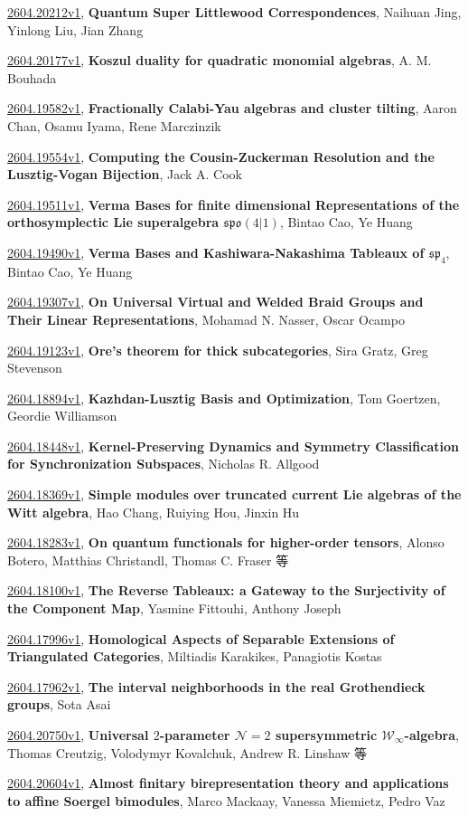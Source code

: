 \documentclass[9pt, a4paper]{article}
\theoremstyle{plain}
\theoremstyle{definition}
\theoremstyle{remark}
\newcommand{\arxiv}[3]{\href{https://arxiv.org/abs/#1}{#1}, \textbf{\textcolor{arxivblue}{#2}}, #3}
\begin{document}
\arxiv{2604.20212v1}{Quantum Super Littlewood Correspondences}{Naihuan Jing, Yinlong Liu, Jian Zhang}

\arxiv{2604.20177v1}{Koszul duality for quadratic monomial algebras}{A. M. Bouhada}

\arxiv{2604.19582v1}{Fractionally Calabi-Yau algebras and cluster tilting}{Aaron Chan, Osamu Iyama, Rene Marczinzik}

\arxiv{2604.19554v1}{Computing the Cousin-Zuckerman Resolution and the Lusztig-Vogan Bijection}{Jack A. Cook}

\arxiv{2604.19511v1}{Verma Bases for finite dimensional Representations of the orthosymplectic Lie superalgebra $\mathfrak{spo}(4|1)$}{Bintao Cao, Ye Huang}

\arxiv{2604.19490v1}{Verma Bases and Kashiwara-Nakashima Tableaux of $\mathfrak{sp}_4$}{Bintao Cao, Ye Huang}

\arxiv{2604.19307v1}{On Universal Virtual and Welded Braid Groups and Their Linear Representations}{Mohamad N. Nasser, Oscar Ocampo}

\arxiv{2604.19123v1}{Ore's theorem for thick subcategories}{Sira Gratz, Greg Stevenson}

\arxiv{2604.18894v1}{Kazhdan-Lusztig Basis and Optimization}{Tom Goertzen, Geordie Williamson}

\arxiv{2604.18448v1}{Kernel-Preserving Dynamics and Symmetry Classification for Synchronization Subspaces}{Nicholas R. Allgood}

\arxiv{2604.18369v1}{Simple modules over truncated current Lie algebras of the Witt algebra}{Hao Chang, Ruiying Hou, Jinxin Hu}

\arxiv{2604.18283v1}{On quantum functionals for higher-order tensors}{Alonso Botero, Matthias Christandl, Thomas C. Fraser 等}

\arxiv{2604.18100v1}{The Reverse Tableaux: a Gateway to the Surjectivity of the Component Map}{Yasmine Fittouhi, Anthony Joseph}

\arxiv{2604.17996v1}{Homological Aspects of Separable Extensions of Triangulated Categories}{Miltiadis Karakikes, Panagiotis Kostas}

\arxiv{2604.17962v1}{The interval neighborhoods in the real Grothendieck groups}{Sota Asai}

\arxiv{2604.20750v1}{Universal $2$-parameter $\mathcal{N}=2$ supersymmetric $\mathcal{W}_{\infty}$-algebra}{Thomas Creutzig, Volodymyr Kovalchuk, Andrew R. Linshaw 等}

\arxiv{2604.20604v1}{Almost finitary birepresentation theory and applications to affine Soergel bimodules}{Marco Mackaay, Vanessa Miemietz, Pedro Vaz}
\end{document}
